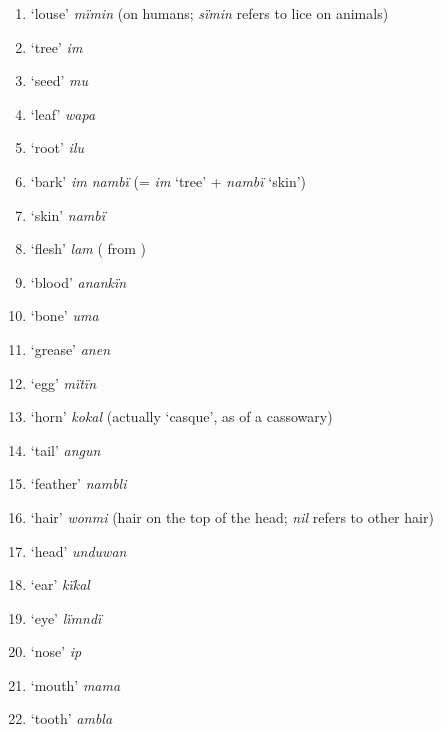 \begin{enumerate}[noitemsep, label={\arabic*}, align=left, widest=190, labelsep=1ex,leftmargin=*]
\item ‘louse’ \textit{mïmin} (on humans; \textit{sïmin} refers to lice on animals)

\item ‘tree’ \textit{im}

\item ‘seed’ \textit{mu}

\item ‘leaf’ \textit{wapa}

\item ‘root’ \textit{ilu}

\item ‘bark’ \textit{im nambï} (= \textit{im} ‘tree’ + \textit{nambï} ‘skin’)

\item ‘skin’ \textit{nambï}

\item ‘flesh’ \textit{lam} ( from )

\item ‘blood’ \textit{anankïn}

\item ‘bone’ \textit{uma}

\item ‘grease’ \textit{anen}

\item ‘egg’ \textit{mïtïn}

\item ‘horn’ \textit{kokal} (actually ‘casque’, as of a cassowary)

\item ‘tail’ \textit{angun}

\item ‘feather’ \textit{nambli}

\item ‘hair’ \textit{wonmi} (hair on the top of the head; \textit{nil} refers to other hair)

\item ‘head’ \textit{unduwan}

\item ‘ear’ \textit{kïkal}

\item ‘eye’ \textit{lïmndï}

\item ‘nose’ \textit{ip}

\item ‘mouth’ \textit{mama}

\item ‘tooth’ \textit{ambla}


\end{enumerate}
